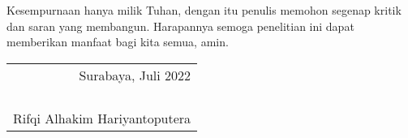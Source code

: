 Kesempurnaan hanya milik Tuhan, dengan itu penulis memohon segenap kritik dan saran yang membangun. Harapannya semoga penelitian ini dapat memberikan manfaat bagi kita semua, amin.

\begin{flushright}
  \begin{tabular}[b]{r}
    Surabaya, Juli 2022\\
    \\
    \\
    \\
    \\
    Rifqi Alhakim Hariyantoputera
  \end{tabular}
\end{flushright}
